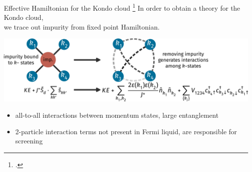 \documentclass[10pt,aspectratio=169]{beamer}
\begin{document}
\begin{frame}{Effective Hamiltonian for the Kondo cloud}
\footcite{anirban_kondo}
In order to obtain a theory for the Kondo cloud,\\ we \alert{trace out impurity} from fixed point Hamiltonian.
\vspace*{\fill}

\includegraphics[width=\textwidth]{KondoCloud.pdf}

\vspace*{\fill}
\begin{itemize}
	\item all-to-all interactions between momentum states, \alert{large entanglement}
	\item 2-particle interaction terms \alert{not} present in Fermi liquid, are \alert{responsible for screening}
\end{itemize}

\end{frame}
\end{document}
